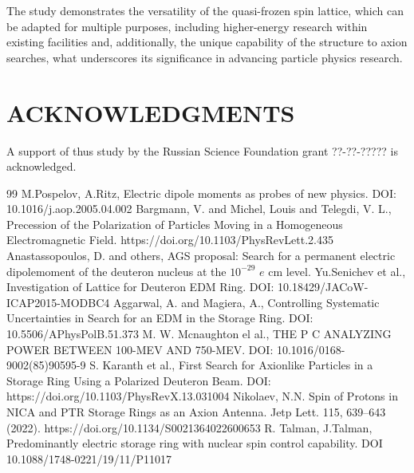 \documentclass[submitting]{nst}
\begin{document}
\par The study demonstrates the versatility of the quasi-frozen spin lattice, which can be adapted for multiple purposes, including higher-energy research within existing facilities and, additionally, the unique capability of the structure to axion searches, what underscores its significance in advancing particle physics research.

\section*{ACKNOWLEDGMENTS}

\par A support of thus study by the Russian Science Foundation grant ??-??-????? is acknowledged.

\begin{thebibliography} {99}
	 M.Pospelov, A.Ritz, Electric dipole moments as probes of new physics. DOI: 10.1016/j.aop.2005.04.002
	 Bargmann, V. and Michel, Louis and Telegdi, V. L., Precession of the Polarization of Particles Moving in a Homogeneous Electromagnetic Field. https://doi.org/10.1103/PhysRevLett.2.435
	 Anastassopoulos, D. and others, AGS proposal: Search for a permanent electric dipolemoment of the deuteron nucleus at the $10^{-29}$ $e$ cm level. 
	 Yu.Senichev et al., Investigation of Lattice for Deuteron EDM Ring. DOI: 10.18429/JACoW-ICAP2015-MODBC4
	 Aggarwal, A. and Magiera, A., Controlling Systematic Uncertainties in Search for an EDM in the Storage Ring. DOI:  10.5506/APhysPolB.51.373
	 M. W. Mcnaughton el al., THE P C ANALYZING POWER BETWEEN 100-MEV AND 750-MEV. DOI: 10.1016/0168-9002(85)90595-9
	 S. Karanth et al., First Search for Axionlike Particles in a Storage Ring Using a Polarized Deuteron Beam. DOI: https://doi.org/10.1103/PhysRevX.13.031004
	 Nikolaev, N.N. Spin of Protons in NICA and PTR Storage Rings as an Axion Antenna. Jetp Lett. 115, 639–643 (2022). https://doi.org/10.1134/S0021364022600653
	 R. Talman, J.Talman, Predominantly electric storage ring with nuclear spin control capability. DOI 10.1088/1748-0221/19/11/P11017


\end{thebibliography}
\end{document}
